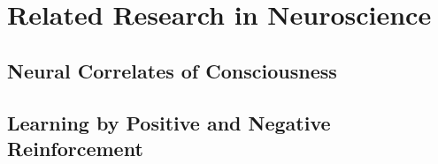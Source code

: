 \chapter{Related Research in Neuroscience}

\section{Neural Correlates of Consciousness}

\section{Learning by Positive and Negative Reinforcement}


